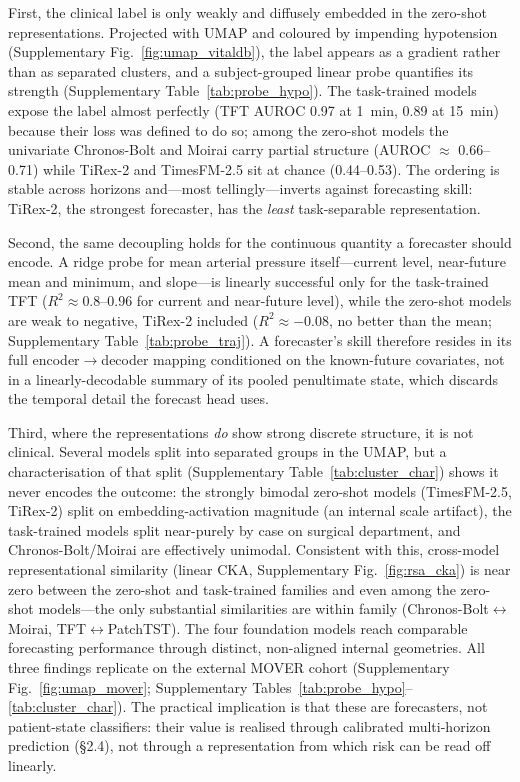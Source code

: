 \documentclass[11pt]{article}
\begin{document}
First, the clinical label is only weakly and diffusely embedded in the zero-shot
representations. Projected with UMAP \citep{McInnes2018} and coloured by impending hypotension
(Supplementary Fig.~\ref{fig:umap_vitaldb}), the label appears as a gradient
rather than as separated clusters, and a subject-grouped linear probe quantifies
its strength (Supplementary Table~\ref{tab:probe_hypo}). The task-trained models
expose the label almost perfectly (TFT AUROC 0.97 at 1~min, 0.89 at 15~min)
because their loss was defined to do so; among the zero-shot models the
univariate Chronos-Bolt and Moirai carry partial structure (AUROC $\approx$
0.66--0.71) while TiRex-2 and TimesFM-2.5 sit at chance (0.44--0.53). The
ordering is stable across horizons and---most tellingly---inverts against
forecasting skill: TiRex-2, the strongest forecaster, has the \emph{least}
task-separable representation.

Second, the same decoupling holds for the continuous quantity a forecaster
should encode. A ridge probe for mean arterial pressure itself---current level,
near-future mean and minimum, and slope---is linearly successful only for the
task-trained TFT ($R^2\approx0.8$--0.96 for current and near-future level),
while the zero-shot models are weak to negative, TiRex-2 included
($R^2\approx-0.08$, no better than the mean; Supplementary
Table~\ref{tab:probe_traj}). A forecaster's skill therefore resides in its full
encoder$\rightarrow$decoder mapping conditioned on the known-future covariates,
not in a linearly-decodable summary of its pooled penultimate state, which
discards the temporal detail the forecast head uses.

Third, where the representations \emph{do} show strong discrete structure, it is
not clinical. Several models split into separated groups in the UMAP, but a
characterisation of that split (Supplementary Table~\ref{tab:cluster_char})
shows it never encodes the outcome: the strongly bimodal zero-shot models
(TimesFM-2.5, TiRex-2) split on embedding-activation magnitude (an internal
scale artifact), the task-trained models split near-purely by case on surgical
department, and Chronos-Bolt/Moirai are effectively unimodal. Consistent with
this, cross-model representational similarity (linear CKA, Supplementary
Fig.~\ref{fig:rsa_cka}) is near zero between the zero-shot and task-trained
families and even among the zero-shot models---the only substantial similarities
are within family (Chronos-Bolt$\leftrightarrow$Moirai, TFT$\leftrightarrow$PatchTST).
The four foundation models reach comparable forecasting performance through
distinct, non-aligned internal geometries. All three findings replicate on the
external MOVER cohort (Supplementary Fig.~\ref{fig:umap_mover}; Supplementary
Tables~\ref{tab:probe_hypo}--\ref{tab:cluster_char}). The practical implication
is that these are forecasters, not patient-state classifiers: their value is
realised through calibrated multi-horizon prediction (\S2.4), not through a
representation from which risk can be read off linearly.
\end{document}
